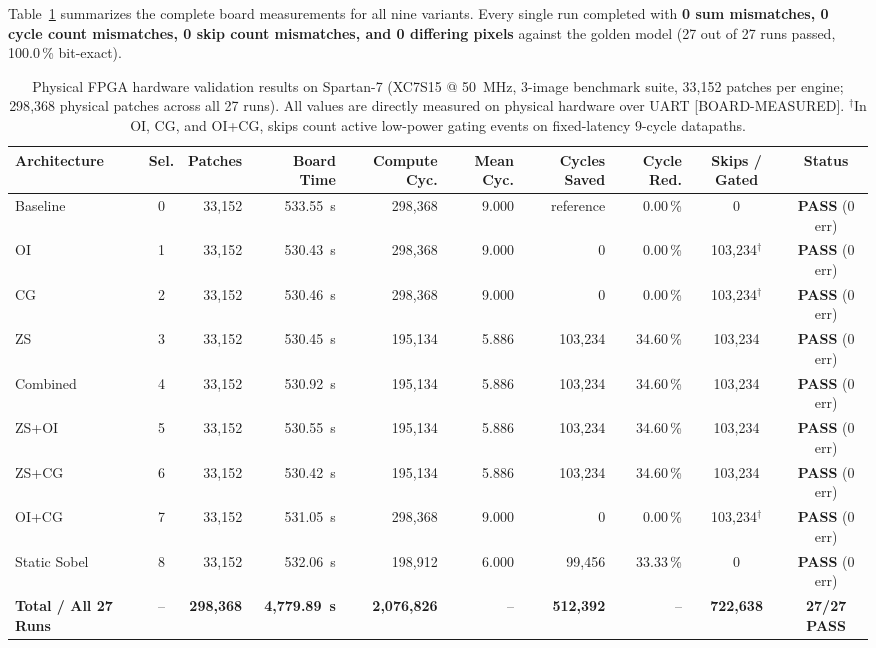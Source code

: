 \documentclass[11pt,journal,draftclsnofoot,onecolumn]{IEEEtran}
\begin{document}
Table~\ref{tab:board_master} summarizes the complete board measurements for all nine
variants. Every single run completed with \textbf{0 sum mismatches, 0 cycle count
mismatches, 0 skip count mismatches, and 0 differing pixels} against the golden model
(27 out of 27 runs passed, 100.0\,\% bit-exact).

\begin{table}[t]
\centering
\caption{Physical FPGA hardware validation results on Spartan-7 (XC7S15 @ 50~MHz, 3-image benchmark suite, 33{,}152 patches per engine; 298{,}368 physical patches across all 27 runs). All values are directly measured on physical hardware over UART [BOARD-MEASURED]. $^{\dagger}$In OI, CG, and OI+CG, skips count active low-power gating events on fixed-latency 9-cycle datapaths.}
\label{tab:board_master}
\small
\setlength{\tabcolsep}{4.5pt}
\begin{tabular}{lcrrrrrrcc}
\toprule
\textbf{Architecture} & \textbf{Sel.} & \textbf{Patches} & \textbf{Board Time} & \textbf{Compute Cyc.} & \textbf{Mean Cyc.} & \textbf{Cycles Saved} & \textbf{Cycle Red.} & \textbf{Skips / Gated} & \textbf{Status}\\
\midrule
Baseline        & 0 & 33{,}152 & 533.55~s & 298{,}368 & 9.000 & reference & 0.00\,\% & 0 & \textbf{PASS} (0 err)\\
OI              & 1 & 33{,}152 & 530.43~s & 298{,}368 & 9.000 & 0         & 0.00\,\% & 103{,}234$^{\dagger}$ & \textbf{PASS} (0 err)\\
CG              & 2 & 33{,}152 & 530.46~s & 298{,}368 & 9.000 & 0         & 0.00\,\% & 103{,}234$^{\dagger}$ & \textbf{PASS} (0 err)\\
ZS              & 3 & 33{,}152 & 530.45~s & 195{,}134 & 5.886 & 103{,}234 & 34.60\,\% & 103{,}234 & \textbf{PASS} (0 err)\\
Combined        & 4 & 33{,}152 & 530.92~s & 195{,}134 & 5.886 & 103{,}234 & 34.60\,\% & 103{,}234 & \textbf{PASS} (0 err)\\
ZS+OI           & 5 & 33{,}152 & 530.55~s & 195{,}134 & 5.886 & 103{,}234 & 34.60\,\% & 103{,}234 & \textbf{PASS} (0 err)\\
ZS+CG           & 6 & 33{,}152 & 530.42~s & 195{,}134 & 5.886 & 103{,}234 & 34.60\,\% & 103{,}234 & \textbf{PASS} (0 err)\\
OI+CG           & 7 & 33{,}152 & 531.05~s & 298{,}368 & 9.000 & 0         & 0.00\,\% & 103{,}234$^{\dagger}$ & \textbf{PASS} (0 err)\\
Static Sobel    & 8 & 33{,}152 & 532.06~s & 198{,}912 & 6.000 &  99{,}456 & 33.33\,\% & 0 & \textbf{PASS} (0 err)\\
\midrule
\textbf{Total / All 27 Runs} & -- & \textbf{298{,}368} & \textbf{4{,}779.89~s} & \textbf{2{,}076{,}826} & -- & \textbf{512{,}392} & -- & \textbf{722{,}638} & \textbf{27/27 PASS}\\
\bottomrule
\end{tabular}
\end{table}
\end{document}
